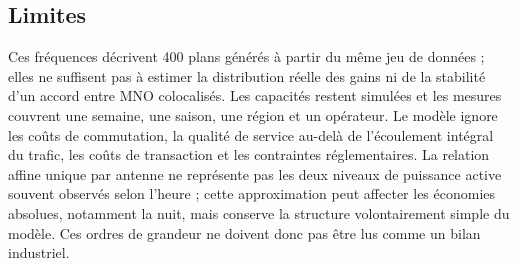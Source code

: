 \subsection{Limites}
\label{subsec:limites_evaluation}

Ces fréquences décrivent 400 plans générés à partir du même jeu de données ;
elles ne suffisent pas à estimer la distribution réelle des
gains ni de la stabilité d'un accord entre MNO colocalisés. Les capacités
restent simulées et les mesures couvrent
une semaine, une saison, une région et un opérateur. Le modèle ignore les
coûts de commutation, la qualité de service au-delà de l'écoulement intégral
du trafic, les coûts de transaction et les contraintes réglementaires. La
relation affine unique par antenne ne représente pas les deux niveaux de
puissance active souvent observés selon l'heure ; cette approximation peut
affecter les économies absolues, notamment la nuit, mais conserve la structure
volontairement simple du modèle. Ces ordres de grandeur ne doivent donc pas
être lus comme un bilan industriel.

\FloatBarrier
